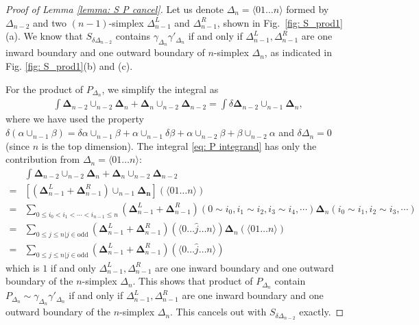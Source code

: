 \documentclass[12pt]{article}
\newcommand{\g}{\gamma}
\begin{document}
\begin{proof}[Proof of Lemma \ref{lemma: S P cancel}]

Let us denote $\Delta_n = \langle 01 \dots n \rangle$ formed by $\Delta_{n-2}$ and two $(n-1)$-simplex $\Delta^L_{n-1}$ and $\Delta^R_{n-1}$, shown in Fig.~\ref{fig: S_prod1}(a). We know that $S_{\delta {\Delta_{n-2}}}$ contains $\g_{\Delta_n} \g'_{\Delta_n}$ if and only if $\Delta^L_{n-1}, \Delta^R_{n-1}$ are one inward boundary and one outward boundary of $n$-simplex $\Delta_n$, as indicated in Fig. \ref{fig: S_prod1}(b) and (c).

For the product of $P_{\Delta_n}$, we simplify the integral as
\begin{equation}
    \begin{split}
        \int \boldsymbol \Delta_{n-2} \cup_{n-2} \boldsymbol \Delta_{n} + \boldsymbol \Delta_{n} \cup_{n-2} \boldsymbol \Delta_{n-2} = \int \delta  \boldsymbol \Delta_{n-2} \cup_{n-1} \boldsymbol \Delta_{n},
    \end{split}
\label{eq: P integrand}
\end{equation}
where we have used the property $\delta (\alpha \cup_{n-1} \beta) = \delta \alpha \cup_{n-1} \beta + \alpha \cup_{n-1} \delta \beta + \alpha \cup_{n-2} \beta + \beta \cup_{n-2} \alpha$ and $\delta \Delta_n = 0$ (since $n$ is the top dimension).
The integral \eqref{eq: P integrand} has only the contribution from $\Delta_n = \langle 01 \dots n \rangle$:
\begin{equation}
    \begin{split}
        &\int \boldsymbol \Delta_{n-2} \cup_{n-2} \boldsymbol \Delta_{n} + \boldsymbol \Delta_{n} \cup_{n-2} \boldsymbol \Delta_{n-2}\\
        =&[(\boldsymbol \Delta^L_{n-1}+ \boldsymbol \Delta^R_{n-1}) \cup_{n-1} \boldsymbol {\Delta_{n}}] (\langle 01 \dots n \rangle) \\
        =&\sum_{0 \leq i_0 < i_1 < \cdots < i_{n-1} \leq n} (\boldsymbol \Delta^L_{n-1}+ \boldsymbol \Delta^R_{n-1}) (0\sim i_0,i_1 \sim i_2, i_3 \sim i_4, \cdots) \boldsymbol \Delta_{n}(i_0\sim i_1, i_2 \sim i_3, \cdots) \\
        =&\sum_{0\leq j \leq n | j \in \text{odd}} (\boldsymbol \Delta^L_{n-1}+ \boldsymbol \Delta^R_{n-1}) (\langle 0 \dots \hat{j} \dots n \rangle)\boldsymbol \Delta_{n} (\langle 01 \dots n \rangle) \\
        =&\sum_{0\leq j \leq n | j \in \text{odd}} (\boldsymbol \Delta^L_{n-1}+ \boldsymbol \Delta^R_{n-1}) (\langle 0 \dots \hat{j} \dots n \rangle)
    \end{split}
\end{equation}
which is $1$ if and only $\Delta^L_{n-1}, \Delta^R_{n-1}$ are one inward boundary and one outward boundary of the $n$-simplex $\Delta_n$. This shows that product of $P_{\Delta_n}$ contain $P_{\Delta_n} \sim \g_{\Delta_n} \g'_{\Delta_n}$ if and only if $\Delta^L_{n-1}, \Delta^R_{n-1}$ are one inward boundary and one outward boundary of the $n$-simplex $\Delta_n$. This cancels out with $S_{\delta {\Delta_{n-2}}}$ exactly.
\end{proof}
\end{document}
